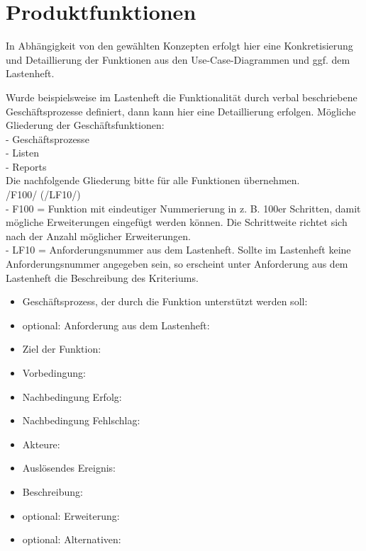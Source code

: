 
\chapter{Produktfunktionen}

In Abhängigkeit von den gewählten Konzepten erfolgt hier eine Konkretisierung
und Detaillierung der Funktionen aus den Use-Case-Diagrammen und ggf. dem
Lastenheft.

Wurde beispielsweise im Lastenheft die Funktionalität durch verbal beschriebene
Geschäftsprozesse definiert, dann kann hier eine Detaillierung erfolgen.
Mögliche Gliederung der Geschäftsfunktionen:\\
-  Geschäftsprozesse\\
-  Listen\\
-  Reports\\
Die nachfolgende Gliederung bitte für alle Funktionen übernehmen.\\

/F100/ (/LF10/)\\
-  F100 = Funktion mit eindeutiger Nummerierung in z. B. 100er Schritten, damit
   mögliche Erweiterungen eingefügt werden können. Die Schrittweite richtet
   sich nach der Anzahl möglicher Erweiterungen.\\
-  LF10 = Anforderungsnummer aus dem Lastenheft. Sollte im Lastenheft keine
   Anforderungsnummer angegeben sein, so erscheint unter Anforderung aus dem
   Lastenheft die Beschreibung des Kriteriums.

\begin{itemize}

\item  Geschäftsprozess, der durch die Funktion unterstützt werden soll:
\item   optional: Anforderung aus dem Lastenheft:
\item   Ziel der Funktion:
\item  Vorbedingung:
\item  Nachbedingung Erfolg:
\item  Nachbedingung Fehlschlag:
\item  Akteure:
\item  Auslösendes Ereignis:
\item  Beschreibung:
\item  optional: Erweiterung:
\item  optional: Alternativen:
\end{itemize}



